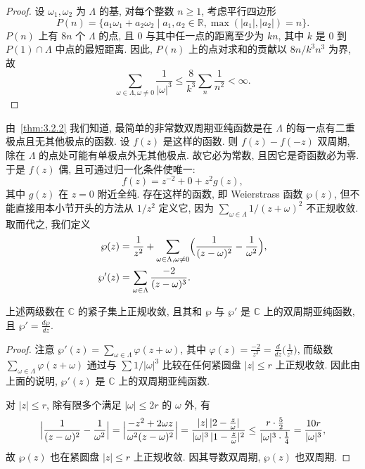 \begin{proof}
设 $\omega_1, \omega_2$ 为 $\Lambda$ 的基, 对每个整数 $n\ge 1$, 考虑平行四边形
\[
P(n) = \{a_1\omega_1 + a_2\omega_2 \mid a_1, a_2\in\mathbb{R}, \max(|a_1|, |a_2|) = n\}.
\]
$P(n)$ 上有 $8n$ 个 $\Lambda$ 的点, 且 $0$ 与其中任一点的距离至少为 $kn$, 其中 $k$ 是 $0$ 到 $P(1)\cap\Lambda$ 中点的最短距离. 因此, $P(n)$ 上的点对求和的贡献以 $8n/k^3n^3$ 为界, 故
\[
\sum\limits_{\omega\in\Lambda, \omega\neq 0}\frac{1}{|\omega|^3}\le\frac{8}{k^3}\sum\limits_n\frac{1}{n^2} < \infty.
\]
\end{proof}

由~\ref{thm:3.2.2} 我们知道, 最简单的非常数双周期亚纯函数是在 $\Lambda$ 的每一点有二重极点且无其他极点的函数. 设 $f(z)$ 是这样的函数. 则 $f(z) - f(-z)$ 双周期, 除在 $\Lambda$ 的点处可能有单极点外无其他极点. 故它必为常数, 且因它是奇函数必为零. 于是 $f(z)$ 偶, 且可通过归一化条件使唯一:
\[
f(z) = z^{-2} + 0 + z^2g(z),
\]
其中 $g(z)$ 在 $z = 0$ 附近全纯. 存在这样的函数, 即 Weierstrass 函数 $\wp(z)$, 但不能直接用本小节开头的方法从 $1/z^2$ 定义它, 因为 $\sum\limits_{\omega\in\Lambda}1/(z+\omega)^2$ 不正规收敛. 取而代之, 我们定义
\begin{align*}
\wp(z) &= \frac{1}{z^2} + \sum\limits_{\omega\in\Lambda, \omega\neq 0}\Bigl(\frac{1}{(z-\omega)^2} - \frac{1}{\omega^2}\Bigr),\\
\wp'(z) &= \sum\limits_{\omega\in\Lambda}\frac{-2}{(z-\omega)^3}.
\end{align*}

\begin{proposition} \label{thm:3.2.4} 
上述两级数在 $\mathbb{C}$ 的紧子集上正规收敛, 且其和 $\wp$ 与 $\wp'$ 是 $\mathbb{C}$ 上的双周期亚纯函数, 且 $\wp' = \frac{d\wp}{dz}$.
\end{proposition}

\begin{proof}
注意 $\wp'(z) = \sum\limits_{\omega\in\Lambda}\varphi(z+\omega)$, 其中 $\varphi(z) = \frac{-2}{z^3} = \frac{d}{dz}\bigl(\frac{1}{z^2}\bigr)$, 而级数 $\sum\limits_{\omega\in\Lambda}\varphi(z+\omega)$ 通过与 $\sum 1/|\omega|^3$ 比较在任何紧圆盘 $|z|\le r$ 上正规收敛. 因此由上面的说明, $\wp'(z)$ 是 $\mathbb{C}$ 上的双周期亚纯函数.

对 $|z|\le r$, 除有限多个满足 $|\omega|\le 2r$ 的 $\omega$ 外, 有
\[
\Bigl|\frac{1}{(z-\omega)^2} - \frac{1}{\omega^2}\Bigr|
= \Bigl|\frac{-z^2 + 2\omega z}{\omega^2(z-\omega)^2}\Bigr|
= \frac{|z|\,|2 - \frac{z}{\omega}|}{|\omega|^3\,|1 - \frac{z}{\omega}|^2}
\le \frac{r\cdot\frac{5}{2}}{|\omega|^3\cdot\frac{1}{4}} = \frac{10r}{|\omega|^3},
\]
故 $\wp(z)$ 也在紧圆盘 $|z|\le r$ 上正规收敛. 因其导数双周期, $\wp(z)$ 也双周期.
\end{proof}

